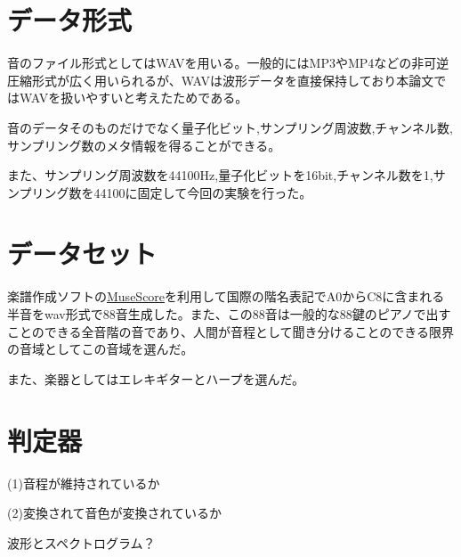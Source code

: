 
\section{データ形式}
音のファイル形式としてはWAVを用いる。一般的にはMP3やMP4などの非可逆圧縮形式が広く用いられるが、WAVは波形データを直接保持しており本論文ではWAVを扱いやすいと考えたためである。





音のデータそのものだけでなく量子化ビット,サンプリング周波数,チャンネル数,サンプリング数のメタ情報を得ることができる。

また、サンプリング周波数を44100Hz,量子化ビットを16bit,チャンネル数を1,サンプリング数を44100に固定して今回の実験を行った。

\section{データセット}

楽譜作成ソフトの\href{https://musescore.org/ja}{MuseScore}を利用して国際の階名表記でA0からC8に含まれる半音をwav形式で88音生成した。また、この88音は一般的な88鍵のピアノで出すことのできる全音階の音であり、人間が音程として聞き分けることのできる限界の音域としてこの音域を選んだ。


また、楽器としてはエレキギターとハープを選んだ。


\section{判定器}

(1)音程が維持されているか

(2)変換されて音色が変換されているか

波形とスペクトログラム？








